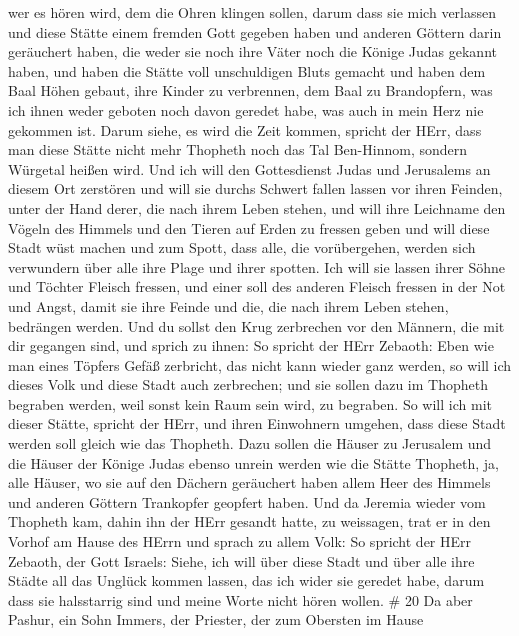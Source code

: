 wer es hören wird, dem die Ohren klingen sollen,  darum dass
sie mich verlassen und diese Stätte einem fremden Gott gegeben haben und
anderen Göttern darin geräuchert haben, die weder sie noch ihre Väter
noch die Könige Judas gekannt haben, und haben die Stätte voll
unschuldigen Bluts gemacht  und haben dem Baal Höhen gebaut,
ihre Kinder zu verbrennen, dem Baal zu Brandopfern, was ich ihnen weder
geboten noch davon geredet habe, was auch in mein Herz nie gekommen ist.
 Darum siehe, es wird die Zeit kommen, spricht der HErr,
dass man diese Stätte nicht mehr Thopheth noch das Tal Ben-Hinnom,
sondern Würgetal heißen wird.  Und ich will den Gottesdienst
Judas und Jerusalems an diesem Ort zerstören und will sie durchs Schwert
fallen lassen vor ihren Feinden, unter der Hand derer, die nach ihrem
Leben stehen, und will ihre Leichname den Vögeln des Himmels und den
Tieren auf Erden zu fressen geben  und will diese Stadt wüst
machen und zum Spott, dass alle, die vorübergehen, werden sich
verwundern über alle ihre Plage und ihrer spotten.  Ich will
sie lassen ihrer Söhne und Töchter Fleisch fressen, und einer soll des
anderen Fleisch fressen in der Not und Angst, damit sie ihre Feinde und
die, die nach ihrem Leben stehen, bedrängen werden.  Und du
sollst den Krug zerbrechen vor den Männern, die mit dir gegangen sind,
 und sprich zu ihnen: So spricht der HErr Zebaoth: Eben wie
man eines Töpfers Gefäß zerbricht, das nicht kann wieder ganz werden, so
will ich dieses Volk und diese Stadt auch zerbrechen; und sie sollen
dazu im Thopheth begraben werden, weil sonst kein Raum sein wird, zu
begraben.  So will ich mit dieser Stätte, spricht der HErr,
und ihren Einwohnern umgehen, dass diese Stadt werden soll gleich wie
das Thopheth.  Dazu sollen die Häuser zu Jerusalem und die
Häuser der Könige Judas ebenso unrein werden wie die Stätte Thopheth,
ja, alle Häuser, wo sie auf den Dächern geräuchert haben allem Heer des
Himmels und anderen Göttern Trankopfer geopfert haben.  Und
da Jeremia wieder vom Thopheth kam, dahin ihn der HErr gesandt hatte, zu
weissagen, trat er in den Vorhof am Hause des HErrn und sprach zu allem
Volk:  So spricht der HErr Zebaoth, der Gott Israels:
Siehe, ich will über diese Stadt und über alle ihre Städte all das
Unglück kommen lassen, das ich wider sie geredet habe, darum dass sie
halsstarrig sind und meine Worte nicht hören wollen. \# 20 
Da aber Pashur, ein Sohn Immers, der Priester, der zum Obersten im Hause
